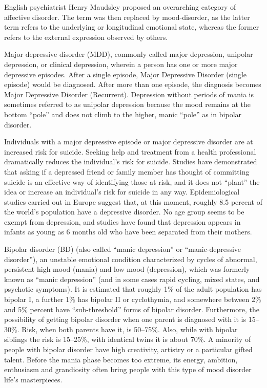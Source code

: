 English psychiatrist Henry Maudsley proposed an overarching category of
affective disorder. The term was then replaced by mood-disorder, as the
latter term refers to the underlying or longitudinal emotional state,
whereas the former refers to the external expression observed by others.

Major depressive disorder (MDD), commonly called major depression,
unipolar depression, or clinical depression, wherein a person has one or
more major depressive episodes. After a single episode, Major Depressive
Disorder (single episode) would be diagnosed. After more than one
episode, the diagnosis becomes Major Depressive Disorder (Recurrent).
Depression without periods of mania is sometimes referred to as unipolar
depression because the mood remains at the bottom ``pole'' and does not
climb to the higher, manic ``pole'' as in bipolar disorder.

Individuals with a major depressive episode or major depressive disorder
are at increased risk for suicide. Seeking help and treatment from a
health professional dramatically reduces the individual's risk for
suicide. Studies have demonstrated that asking if a depressed friend or
family member has thought of committing suicide is an effective way of
identifying those at risk, and it does not ``plant'' the idea or
increase an individual's risk for suicide in any way. Epidemiological
studies carried out in Europe suggest that, at this moment, roughly 8.5
percent of the world's population have a depressive disorder. No age
group seems to be exempt from depression, and studies have found that
depression appears in infants as young as 6 months old who have been
separated from their mothers.

Bipolar disorder (BD) (also called ``manic depression'' or
``manic-depressive disorder''), an unstable emotional condition
characterized by cycles of abnormal, persistent high mood (mania) and
low mood (depression), which was formerly known as ``manic depression''
(and in some cases rapid cycling, mixed states, and psychotic symptoms).
It is estimated that roughly 1\% of the adult population has bipolar I,
a further 1\% has bipolar II or cyclothymia, and somewhere between 2\%
and 5\% percent have ``sub-threshold'' forms of bipolar disorder.
Furthermore, the possibility of getting bipolar disorder when one parent
is diagnosed with it is 15--30\%. Risk, when both parents have it, is
50--75\%. Also, while with bipolar siblings the risk is 15--25\%, with
identical twins it is about 70\%. A minority of people with bipolar
disorder have high creativity, artistry or a particular gifted talent.
Before the mania phase becomes too extreme, its energy, ambition,
enthusiasm and grandiosity often bring people with this type of mood
disorder life's masterpieces.

